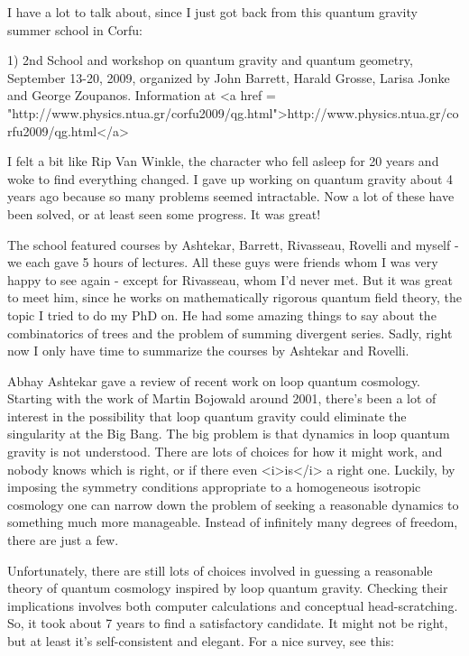 


I have a lot to talk about, since I just got back from this quantum
gravity summer school in Corfu:

1) 2nd School and workshop on quantum gravity and quantum geometry,
September 13-20, 2009, organized by John Barrett, Harald Grosse,
Larisa Jonke and George Zoupanos.  Information at
<a href = "http://www.physics.ntua.gr/corfu2009/qg.html">http://www.physics.ntua.gr/corfu2009/qg.html</a>

I felt a bit like Rip Van Winkle, the character who fell asleep for 20
years and woke to find everything changed.  I gave up working on
quantum gravity about 4 years ago because so many problems seemed
intractable.  Now a lot of these have been solved, or at least seen
some progress.  It was great!

The school featured courses by Ashtekar, Barrett, Rivasseau, Rovelli
and myself - we each gave 5 hours of lectures.  All these guys were
friends whom I was very happy to see again - except for Rivasseau, whom
I'd never met.  But it was great to meet him, since he works on
mathematically rigorous quantum field theory, the topic I tried to do
my PhD on.  He had some amazing things to say about the combinatorics
of trees and the problem of summing divergent series.  Sadly, right
now I only have time to summarize the courses by Ashtekar and Rovelli.

Abhay Ashtekar gave a review of recent work on loop quantum cosmology.
Starting with the work of Martin Bojowald around 2001, there's been a
lot of interest in the possibility that loop quantum gravity could
eliminate the singularity at the Big Bang.  The big problem is that
dynamics in loop quantum gravity is not understood.  There are lots of
choices for how it might work, and nobody knows which is right, or if
there even <i>is</i> a right one.  Luckily, by imposing the symmetry
conditions appropriate to a homogeneous isotropic cosmology one can
narrow down the problem of seeking a reasonable dynamics to something
much more manageable.  Instead of infinitely many degrees of freedom,
there are just a few.

Unfortunately, there are still lots of choices involved in guessing a
reasonable theory of quantum cosmology inspired by loop quantum
gravity.  Checking their implications involves both computer
calculations and conceptual head-scratching.  So, it took about 7
years to find a satisfactory candidate.  It might not be right, but at
least it's self-consistent and elegant.  For a nice survey, see this:

